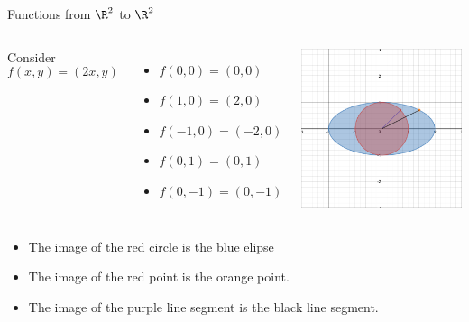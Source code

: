 \documentclass{beamer}
\begin{document}
\begin{frame}{Functions from $\R^2$ to $\R^2$}

\begin{columns}
\column[T]{5cm}
Consider
$$f(x,y) = (2x, y)$$

\begin{itemize}
\item $f(0, 0) = (0, 0)$
\item $f(1, 0) = (2, 0)$
\item $f(-1, 0) = (-2, 0)$
\item $f(0,1) = (0,1)$
\item $f(0,-1) = (0,-1)$
\end{itemize}

\column[T]{5cm}
\includegraphics[scale=0.25]{circle-to-elipse}
\end{columns}
\begin{itemize}
\item The image of the red circle is the blue elipse
\item The image of the red point is the orange point.
\item The image of the purple line segment is the black line segment.
\end{itemize}

\end{frame}
\end{document}

